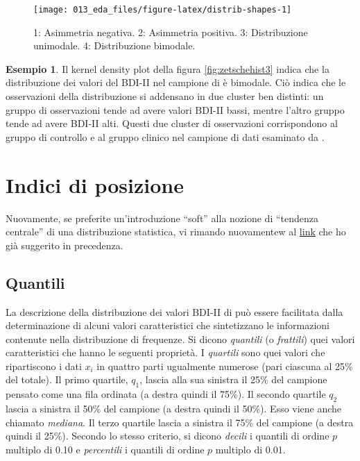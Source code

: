 \documentclass[
  10pt,
  italian,
  a4paper,
  extrafontsizes,onecolumn,openright
  ]{memoir}
\theoremstyle{definition}
\theoremstyle{definition}
\newtheorem{example}{Esempio}[chapter]
\theoremstyle{definition}
\theoremstyle{definition}
\theoremstyle{remark}
\begin{document}
\begin{figure}[h]

{\centering \texttt{[image: 013\_eda\_files/figure-latex/distrib-shapes-1]} 

}

\caption{1: Asimmetria negativa. 2: Asimmetria positiva. 3: Distribuzione unimodale. 4: Distribuzione bimodale.}\label{fig:distrib-shapes}
\end{figure}

\begin{example}
Il kernel density plot della figura \ref{fig:zetschehist3} indica che la distribuzione dei valori del BDI-II nel campione di \textcite{zetschefuture2019} è bimodale. Ciò indica che le osservazioni della distribuzione si addensano in due cluster ben distinti: un gruppo di osservazioni tende ad avere valori BDI-II bassi, mentre l'altro gruppo tende ad avere BDI-II alti. Questi due cluster di osservazioni corrispondono al gruppo di controllo e al gruppo clinico nel campione di dati esaminato da \textcite{zetschefuture2019}.
\end{example}

\hypertarget{indici-di-posizione}{%
\section{Indici di posizione}\label{indici-di-posizione}}

Nuovamente, se preferite un'introduzione ``soft'' alla nozione di ``tendenza centrale'' di una distribuzione statistica, vi rimando nuovamentew al \href{https://tinystats.github.io/teacups-giraffes-and-statistics/03_mean.html}{link} che ho già suggerito in precedenza.

\hypertarget{quantili}{%
\subsection{Quantili}\label{quantili}}

La descrizione della distribuzione dei valori BDI-II di
\textcite{zetschefuture2019} può essere facilitata dalla determinazione di
alcuni valori caratteristici che sintetizzano le informazioni contenute
nella distribuzione di frequenze. Si dicono \emph{quantili} (o \emph{frattili})
quei valori caratteristici che hanno le seguenti proprietà. I \emph{quartili}
sono quei valori che ripartiscono i dati \(x_i\) in quattro parti
ugualmente numerose (pari ciascuna al 25\% del totale). Il primo
quartile, \(q_1\), lascia alla sua sinistra il 25\% del campione pensato
come una fila ordinata (a destra quindi il 75\%). Il secondo quartile
\(q_2\) lascia a sinistra il 50\% del campione (a destra quindi il 50\%).
Esso viene anche chiamato \emph{mediana}. Il terzo quartile lascia a sinistra
il 75\% del campione (a destra quindi il 25\%). Secondo lo stesso
criterio, si dicono \emph{decili} i quantili di ordine \(p\) multiplo di 0.10 e
\emph{percentili} i quantili di ordine \(p\) multiplo di 0.01.
\end{document}
